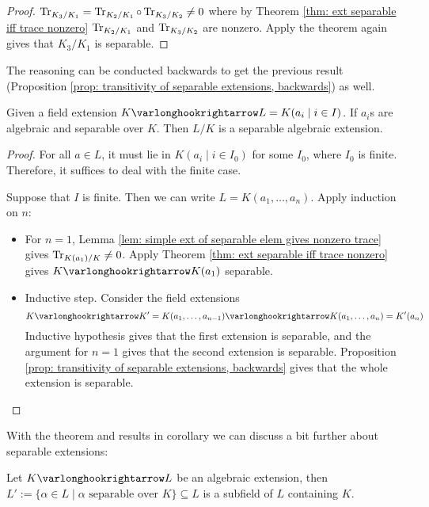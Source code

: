 \documentclass{article}
\begin{document}
\begin{proof}
    $\operatorname{Tr}_{K_3/K_1} = \operatorname{Tr}_{K_2/K_1} \circ \operatorname{Tr}_{K_3/K_2} \neq 0$ where by Theorem \ref{thm: ext separable iff trace nonzero} $\operatorname{Tr}_{K_2/K_1}$ and $\operatorname{Tr}_{K_3/K_2}$ are nonzero. Apply the theorem again gives that $K_3/K_1$ is separable. 
\end{proof}

\begin{remark}
    The reasoning can be conducted backwards to get the previous result (Proposition \ref{prop: transitivity of separable extensions, backwards}) as well. 
\end{remark}

\begin{corollary}\label{cor: extension generated by separable elements is separable}
    Given a field extension $K \ext L = K(a_i \mid i \in I)$. If $a_i$s are algebraic and separable over $K$. Then $L/K$ is a separable algebraic extension.
\end{corollary}

\begin{proof}
    For all $a \in L$, it must lie in $K(a_i \mid i \in I_0)$ for some $I_0$, where $I_0$ is finite. Therefore, it suffices to deal with the finite case.

    Suppose that $I$ is finite. Then we can write $L = K(a_1, \dots, a_n)$. Apply induction on $n$: 
    \begin{itemize}
        \item For $n = 1$, Lemma \ref{lem: simple ext of separable elem gives nonzero trace} gives $\operatorname{Tr}_{K(a_1)/K} \neq 0$. Apply Theorem \ref{thm: ext separable iff trace nonzero} gives $K \ext K(a_1)$ separable. 
        \item Inductive step. Consider the field extensions
        \[
            K \ext K' = K(a_1, \dots, a_{n-1}) \ext K(a_1, \dots, a_{n}) = K'(a_n)
        \]
        Inductive hypothesis gives that the first extension is separable, and the argument for $n = 1$ gives that the second extension is separable. Proposition \ref{prop: transitivity of separable extensions, backwards} gives that the whole extension is separable. 
    \end{itemize}
\end{proof}

\textstart
With the theorem and results in corollary we can discuss a bit further about separable extensions:

\begin{proposition}
    Let $K \ext L$ be an algebraic extension, then $L' := \{ \alpha \in L \mid \alpha \text{ separable over $K$}\} \subseteq L$ is a subfield of $L$ containing $K$.
\end{proposition}
\end{document}
